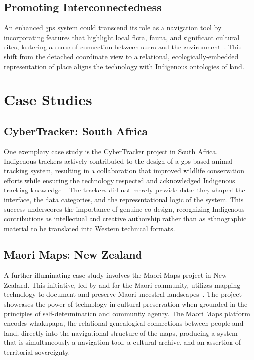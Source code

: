 \documentclass[11pt,showkeys]{essay}
\begin{document}
\subsection{Promoting Interconnectedness}

An enhanced \gls{gps} system could transcend its role as a navigation tool by incorporating features that highlight local flora, fauna, and significant cultural sites, fostering a sense of connection between users and the environment~\cite{firstnations_innovation_2022}. This shift from the detached coordinate view to a relational, ecologically-embedded representation of place aligns the technology with Indigenous ontologies of land.

\section{Case Studies}

\subsection{CyberTracker: South Africa}

One exemplary case study is the CyberTracker project in South Africa. Indigenous trackers actively contributed to the design of a \gls{gps}-based animal tracking system, resulting in a collaboration that improved wildlife conservation efforts while ensuring the technology respected and acknowledged Indigenous tracking knowledge~\cite{cross_indigenous_2020,liebenberg_citizen_2015}. The trackers did not merely provide data: they shaped the interface, the data categories, and the representational logic of the system. This success underscores the importance of genuine co-design, recognizing Indigenous contributions as intellectual and creative authorship rather than as ethnographic material to be translated into Western technical formats.

\subsection{Maori Maps: New Zealand}

A further illuminating case study involves the Maori Maps project in New Zealand. This initiative, led by and for the Maori community, utilizes mapping technology to document and preserve Maori ancestral landscapes~\cite{oppenneer_maori_2011,scoop_maori_2021,tapsell_maorimaps_2011}. The project showcases the power of technology in cultural preservation when grounded in the principles of self-determination and community agency. The Maori Maps platform encodes whakapapa, the relational genealogical connections between people and land, directly into the navigational structure of the maps, producing a system that is simultaneously a navigation tool, a cultural archive, and an assertion of territorial sovereignty.
\end{document}
